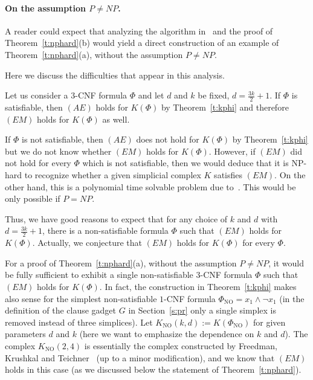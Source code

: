 \documentclass[runningheads]{llncs}
\theoremstyle{remark}
\theoremstyle{definition}
\DeclareMathOperator\NO{NO}
\def\Phin{\Phi_{\NO}}
\def\Kn{K_{\NO}}
\begin{document}
\paragraph{On the assumption $P \neq NP$.}
A reader could expect that analyzing the algorithm in~\cite{CKV} and the proof of Theorem~\ref{t:nphard}(b) would yield a direct construction of an example of Theorem~\ref{t:nphard}(a), without the assumption $P\neq NP$.
{Here we discuss the difficulties that appear in this analysis.

Let us consider a 3-CNF formula $\Phi$ and let $d$ and $k$ be fixed, $d = \frac{3k}2 + 1$.
If $\Phi$ is satisfiable, then $(AE)$ holds for $K(\Phi)$ by Theorem~\ref{t:kphi} and therefore $(EM)$ holds for
$K(\Phi)$ as well.

If $\Phi$ is not satisfiable, then $(AE)$ does not hold for $K(\Phi)$ by
Theorem~\ref{t:kphi} but we do not know whether $(EM)$ holds for $K(\Phi)$.
However, if $(EM)$ did not hold for every $\Phi$ which is not satisfiable, then
we would deduce that it is NP-hard to recognize whether a given simplicial
complex $K$ satisfies $(EM)$. On the other hand, this is a polynomial time
solvable problem due to~\cite{CKV}. This would be only possible if $P = NP$.

Thus, we have good reasons to expect that for any choice of $k$ and $d$ with $d
= \frac{3k}2 + 1$, there is a non-satisfiable formula $\Phi$ such that
$(EM)$ holds for $K(\Phi)$. Actually, we conjecture that $(EM)$ holds for $K(\Phi)$ for every $\Phi$.

For a proof of Theorem~\ref{t:nphard}(a), without the assumption $P \neq NP$,
it would be fully sufficient to exhibit a single non-satisfiable $3$-CNF
formula $\Phi$ such that $(EM)$ holds for $K(\Phi)$. In fact, the construction in
Theorem~\ref{t:kphi} makes also sense for the simplest non-satisfiable $1$-CNF
formula $\Phin = x_1 \wedge \neg x_1$ (in the definition of the clause gadget
$G$ in Section~\ref{s:pr} only a single simplex is removed instead of three
simplices). Let $\Kn(k,d) := K(\Phin)$ for given
parameters $d$ and $k$ (here we want to emphasize the dependence on $k$ and
$d$). The complex $\Kn(2,4)$ is essentially the complex constructed by Freedman,
Krushkal and Teichner~\cite{FKT} (up to a minor modification), and we know that
$(EM)$ holds in this case (as we discussed below the statement of
Theorem~\ref{t:nphard}).

}
\end{document}
